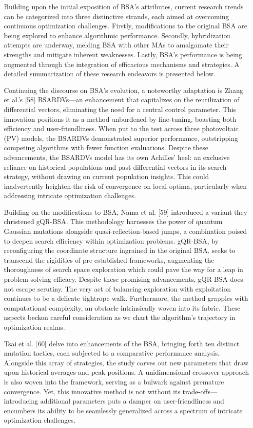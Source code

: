\documentclass{article} %
\begin{document}
Building upon the initial exposition of BSA's attributes, current research trends can be categorized into three distinctive strands, each aimed at overcoming continuous optimization challenges. Firstly, modifications to the original BSA are being explored to enhance algorithmic performance. Secondly, hybridization attempts are underway, melding BSA with other MAs to amalgamate their strengths and mitigate inherent weaknesses. Lastly, BSA's performance is being augmented through the integration of efficacious mechanisms and strategies. A detailed summarization of these research endeavors is presented below.

Continuing the discourse on BSA's evolution, a noteworthy adaptation is Zhang et al.'s [58] BSARDVs---an enhancement that capitalizes on the reutilization of differential vectors, eliminating the need for a central control parameter. This innovation positions it as a method unburdened by fine-tuning, boasting both efficiency and user-friendliness. When put to the test across three photovoltaic (PV) models, the BSARDVs demonstrated superior performance, outstripping competing algorithms with fewer function evaluations. Despite these advancements, the BSARDVs model has its own Achilles' heel: an exclusive reliance on historical populations and past differential vectors in its search strategy, without drawing on current population insights. This could inadvertently heighten the risk of convergence on local optima, particularly when addressing intricate optimization challenges.

Building on the modifications to BSA, Nama et al. [59] introduced a variant they christened gQR-BSA. This methodology harnesses the power of quantum Gaussian mutations alongside quasi-reflection-based jumps, a combination poised to deepen search efficiency within optimization problems. gQR-BSA, by reconfiguring the coordinate structure ingrained in the original BSA, seeks to transcend the rigidities of pre-established frameworks, augmenting the thoroughness of search space exploration which could pave the way for a leap in problem-solving efficacy. Despite these promising advancements, gQR-BSA does not escape scrutiny. The very act of balancing exploration with exploitation continues to be a delicate tightrope walk. Furthermore, the method grapples with computational complexity, an obstacle intrinsically woven into its fabric. These aspects beckon careful consideration as we chart the algorithm's trajectory in optimization realms.

Tsai et al. [60] delve into enhancements of the BSA, bringing forth ten distinct mutation tactics, each subjected to a comparative performance analysis. Alongside this array of strategies, the study carves out new parameters that draw upon historical averages and peak positions. A unidimensional crossover approach is also woven into the framework, serving as a bulwark against premature convergence. Yet, this innovative method is not without its trade-offs---introducing additional parameters puts a damper on user-friendliness and encumbers its ability to be seamlessly generalized across a spectrum of intricate optimization challenges.
\end{document}
